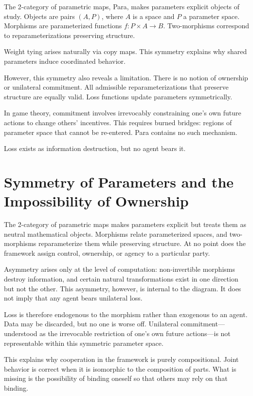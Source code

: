 \documentclass[11pt]{article}
\begin{document}
The 2-category of parametric maps, Para, makes parameters explicit objects of
study. Objects are pairs $(A, P)$, where $A$ is a space and $P$ a parameter
space. Morphisms are parameterized functions $f : P \times A \rightarrow B$.
Two-morphisms correspond to reparameterizations preserving structure.

Weight tying arises naturally via copy maps. This symmetry explains why shared
parameters induce coordinated behavior.

However, this symmetry also reveals a limitation. There is no notion of ownership
or unilateral commitment. All admissible reparameterizations that preserve
structure are equally valid. Loss functions update parameters symmetrically.

In game theory, commitment involves irrevocably constraining one’s own future
actions to change others’ incentives. This requires burned bridges: regions of
parameter space that cannot be re-entered. Para contains no such mechanism.

Loss exists as information destruction, but no agent bears it.

\section{Symmetry of Parameters and the Impossibility of Ownership}

The 2-category of parametric maps makes parameters explicit but treats them as
neutral mathematical objects. Morphisms relate parameterized spaces, and
two-morphisms reparameterize them while preserving structure. At no point does
the framework assign control, ownership, or agency to a particular party.

Asymmetry arises only at the level of computation: non-invertible morphisms
destroy information, and certain natural transformations exist in one direction
but not the other. This asymmetry, however, is internal to the diagram. It does
not imply that any agent bears unilateral loss.

Loss is therefore endogenous to the morphism rather than exogenous to an agent.
Data may be discarded, but no one is worse off. Unilateral commitment—understood
as the irrevocable restriction of one’s own future actions—is not representable
within this symmetric parameter space.

This explains why cooperation in the framework is purely compositional. Joint
behavior is correct when it is isomorphic to the composition of parts. What is
missing is the possibility of binding oneself so that others may rely on that
binding.
\end{document}
